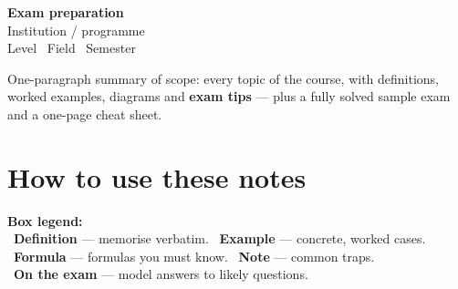 \documentclass[11pt,a4paper]{report}
\begin{document}
\begin{titlepage}

\vspace*{6.5cm}
\noindent\begin{minipage}{\textwidth}\sffamily
{\Large\bfseries\color{dwblue} Exam preparation}\\[6pt]
{\large\color{dwgray} Institution / programme}\\[2pt]
{\large\color{dwgray} Level \textbullet\ Field \textbullet\ Semester}\\[14pt]
\end{minipage}

\vfill
\begin{tcolorbox}[enhanced,colback=dwboxgray,colframe=dwblue,boxrule=1pt,arc=3pt,
   title={\faMapSigns\ \bfseries What's inside},fonttitle=\sffamily,coltitle=white,
   attach boxed title to top left={xshift=10pt,yshift=-\tcboxedtitleheight/2},
   boxed title style={colback=dwblue}]
\sffamily\small
One-paragraph summary of scope: every topic of the course, with definitions,
worked examples, diagrams and \textbf{exam tips} — plus a fully solved sample
exam and a one-page cheat sheet.
\end{tcolorbox}
\end{titlepage}

\renewcommand{\contentsname}{\color{dwblue}\sffamily Contents}
\tableofcontents
{}
\cleardoublepage

\chapter*{How to use these notes}

\begin{keypoint}
\sffamily\small
\textbf{Box legend:}\\[4pt]
\faBookmark~\textcolor{dwblue}{\textbf{Definition}} — memorise verbatim.\quad
\faLightbulb~\textcolor{dwgreen}{\textbf{Example}} — concrete, worked cases.\\[3pt]
\faCalculator~\textcolor{dwpurple}{\textbf{Formula}} — formulas you must know.\quad
\faExclamationTriangle~\textcolor{dworange}{\textbf{Note}} — common traps.\\[3pt]
\faGraduationCap~\textcolor{dwred}{\textbf{On the exam}} — model answers to likely questions.
\end{keypoint}
\end{document}

